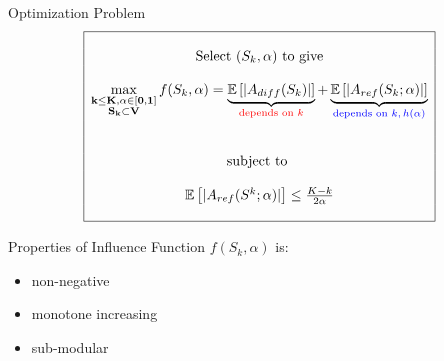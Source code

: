 \documentclass{beamer}
\begin{document}
\begin{frame}{Optimization Problem}
  \begin{equation*}
    \label{opt_problem}
    \begin{array}{|c|}
      \hline\\
      \text{Select } (S_k,\alpha) \text{ to give}\\ \\
      \max\limits_{\substack{\mathbf{k \leq K, \alpha \in [0,1]} \\ \mathbf{S_k \subset V}}} f(S_k,\alpha) = \underbrace{\mathbb{E}\left[|A_{diff}(S_k)|\right]}_{\text{\color{red}{depends on $k$}}} + \underbrace{\mathbb{E}\left[|A_{ref}(S_k;\alpha)|\right]}_{\text{\color{blue}{depends on $k,h(\alpha)$}}} \\ \\ \\
      
      \text{subject to } \\ \\
      \mathbb{E}\left[|A_{ref}(S^k;\alpha)|\right] \leq \frac{K-k}{2\alpha} \\ \\
      \hline
    \end{array}
  \end{equation*}
\end{frame}

\begin{frame}{Properties of Influence Function}
$f(S_k,\alpha)$ is:
\begin{itemize}
\item non-negative
\item monotone increasing
\item sub-modular
\end{itemize}

\end{frame}
\end{document}
